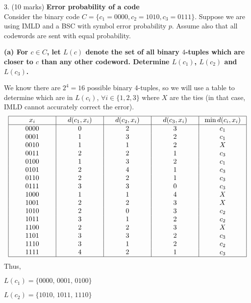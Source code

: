 


3. (10 marks) \textbf{Error probability of a code}\\
Consider the binary code $C=\{c_1=0000, c_2=1010, c_3=0111\}$.
Suppose we are using IMLD and a BSC with symbol error probability $p$.
Assume also that all codewords are sent with equal probability.

\textbf{(a) For $c \in C$, let $L(c)$ denote the set of all binary $4$-tuples
which are closer to $c$ than any other codeword. Determine $L(c_1)$,
$L(c_2)$ and $L(c_3)$.}

We know there are $ 2^4=16 $ possible binary 4-tuples, so we will use a table
to determine which are in $ L(c_i) $, $ \forall i\in\{1,2,3\} $ where $ X $ are the ties
(in that case, IMLD cannot accurately correct the error).
\[
\begin{tabular}{| *{5}{>{\centering\arraybackslash}p{2cm} |}}
    \hline
    $x_i$ & $d(c_1,x_i)$ & $d(c_2,x_i)$ & $d(c_3,x_i)$ & $\min d(c_i,x_i) $\\
    \hline
    $0000$ & $0$ & $2$ & $3$ & $c_1$\\
    $0001$ & $1$ & $3$ & $2$ & $c_1$\\
    $0010$ & $1$ & $1$ & $2$ & $X$\\
    $0011$ & $2$ & $2$ & $1$ & $c_3$\\
    $0100$ & $1$ & $3$ & $2$ & $c_1$\\
    $0101$ & $2$ & $4$ & $1$ & $c_3$\\
    $0110$ & $2$ & $2$ & $1$ & $c_3$\\
    $0111$ & $3$ & $3$ & $0$ & $c_3$\\
    $1000$ & $1$ & $1$ & $4$ & $X$\\
    $1001$ & $2$ & $2$ & $3$ & $X$\\
    $1010$ & $2$ & $0$ & $3$ & $c_2$\\
    $1011$ & $3$ & $1$ & $2$ & $c_2$\\
    $1100$ & $2$ & $2$ & $3$ & $X$\\
    $1101$ & $3$ & $3$ & $2$ & $c_3$\\
    $1110$ & $3$ & $1$ & $2$ & $c_2$\\
    $1111$ & $4$ & $2$ & $1$ & $c_3$\\
    \hline
\end{tabular}
\]
Thus,

$ L(c_1)=\{0000,\,0001,\,0100\} $

$ L(c_2)=\{1010,\,1011,\,1110\} $


